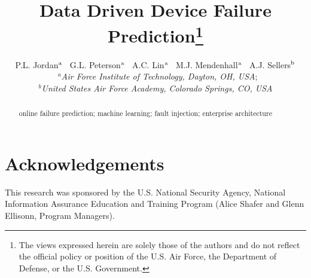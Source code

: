 \documentclass[]{tEIS2e}
\begin{document}

\title{Data Driven Device Failure Prediction\footnote{The views expressed
herein are solely those of the authors and do not reflect the official policy
or position of the U.S. Air Force, the Department of Defense, or the U.S.
Government.}}


\author{P.L. Jordan$^{\rm a}$ \
        G.L. Peterson$^{\rm a}$ \
        A.C. Lin$^{\rm a}$ \
        M.J. Mendenhall$^{\rm a}$ \
        A.J. Sellers$^{\rm b}$ \\\vspace{6pt} \
        $^{a}${\em{Air Force Institute of Technology, Dayton, OH, USA}}; \\
        $^{b}${\em{United States Air Force Academy, Colorado Springs, CO, USA}}}
  
\maketitle

\begin{abstract}


\begin{keywords}
online failure prediction; machine learning; fault injection; enterprise
architecture
\end{keywords}

\end{abstract}


\section*{Acknowledgements}
This research was sponsored by the U.S. National Security Agency, National
Information Assurance Education and Training Program (Alice Shafer and Glenn
Ellisonn, Program Managers).


 

\label{lastpage}
\end{document}
